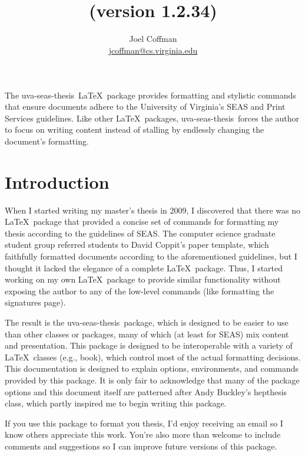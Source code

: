 \documentclass[10pt]{article}
\title{\thispackage\\{\normalsize (version 1.2.34)}}
\author{
  Joel Coffman\\
  \url{jcoffman@cs.virginia.edu}
}
\newcommand{\class}[1]{#1}
\newcommand{\package}[1]{#1}
\newcommand{\thispackage}{\package{uva-seas-thesis}}
\begin{document}
\maketitle

The \thispackage\ \LaTeX\ package provides formatting and stylistic commands that ensure documents adhere to the University of Virginia's \gls{SEAS} and Print Services guidelines.
Like other \LaTeX\ packages, \thispackage\ forces the author to focus on writing content instead of stalling by endlessly changing the document's formatting.

\section{Introduction}\label{section:introduction}
When I started writing my master's thesis in 2009, I discovered that there was no \LaTeX\ package that provided a concise set of commands for formatting my thesis according to the guidelines of \gls{SEAS}.
The computer science graduate student group referred students to David Coppit's paper template, which faithfully formatted documents according to the aforementioned guidelines, but I thought it lacked the elegance of a complete \LaTeX\ package.
Thus, I started working on my own \LaTeX\ package to provide similar functionality without exposing the author to any of the low-level commands (like formatting the signatures page).

The result is the \thispackage\ package, which is designed to be easier to use than other classes or packages, many of which (at least for \gls{SEAS}) mix content and presentation.
This package is designed to be interoperable with a variety of \LaTeX\ classes (e.g., \class{book}), which control most of the actual formatting decisions.
This documentation is designed to explain options, environments, and commands provided by this package.
It is only fair to acknowledge that many of the package options and this document itself are patterned after Andy Buckley's \class{hepthesis} class, which partly inspired me to begin writing this package.

If you use this package to format you thesis, I'd enjoy receiving an email so I know others appreciate this work.
You're also more than welcome to include comments and suggestions so I can improve future versions of this package.

\end{document}
